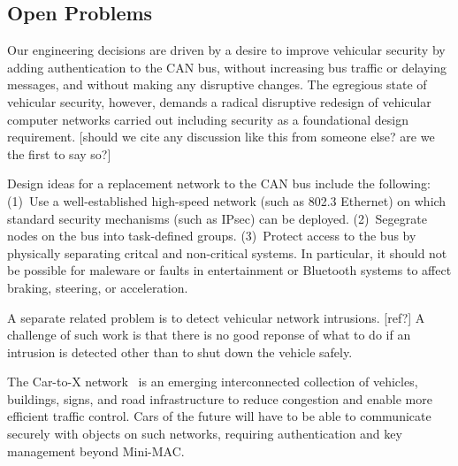 


\subsection{Open Problems}
\label{open}

Our engineering decisions are driven by a desire to improve vehicular security by adding authentication
to the CAN bus, without increasing bus traffic or delaying messages, and without making any
disruptive changes.  The egregious state of vehicular security, however, demands a radical disruptive
redesign of vehicular computer networks carried out including security as a foundational design
requirement. [should we cite any discussion like this from someone else?  are we the first to say so?]

Design ideas for a replacement network to the CAN bus include the following:  
(1)~Use a well-established high-speed network (such as 802.3 Ethernet) on which
standard security mechanisms (such as IPsec) can be deployed.
(2)~Segegrate nodes on the bus into task-defined groups.
(3)~Protect access to the bus by physically separating critcal and non-critical systems.
In particular, it should not be possible for maleware or faults in entertainment or 
Bluetooth systems to affect braking, steering, or acceleration.  

A separate related problem is to detect vehicular network intrusions. [ref?]  A challenge of such work is that
there is no good reponse of what to do if an intrusion is detected other than to shut down the vehicle safely.

The Car-to-X network~\cite{C2X} is an emerging interconnected collection of vehicles, buildings, signs, and road infrastructure 
to reduce congestion and enable more efficient traffic control. Cars of the future will have to be able to communicate
securely with objects on such networks, requiring authentication and key management beyond Mini-MAC.


